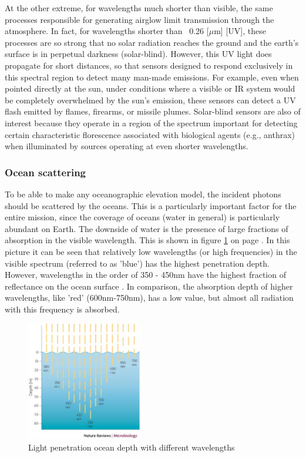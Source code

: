 At the other extreme, for wavelengths much shorter than visible, the same processes responsible for generating airglow limit transmission through the atmosphere. In fact, for wavelengths shorter than ~0.26 [$\mu$m] [\ac{UV}], these processes are so strong that no solar radiation reaches the ground and the earth's surface is in perpetual darkness (solar-blind). However, this \acs{UV} light does propagate for short distances, so that sensors designed to respond exclusively in this spectral region to detect many man-made emissions. For example, even when pointed directly at the sun, under conditions where a visible or \ac{IR} system would be completely overwhelmed by the sun's emission, these sensors can detect a UV flash emitted by flames, firearms, or missile plumes. Solar-blind sensors are also of interest because they operate in a region of the spectrum important for detecting certain characteristic florescence associated with biological agents (e.g., anthrax) when illuminated by sources operating at even shorter wavelengths. 

\subsubsection{Ocean scattering}
\label{introOcean}
To be able to make any oceanographic elevation model, the incident photons should be scattered by the oceans. This is a particularly important factor for the entire mission, since the coverage of oceans (water in general) is particularly abundant on Earth. The downside of water is the presence of large fractions of absorption in the visible wavelength. This is shown in figure \ref{fig:intro_ocean_penetrate} on page \pageref{fig:intro_ocean_penetrate}. In this picture it can be seen that relatively low wavelengths (or high frequencies) in the visible spectrum (referred to as 'blue') has the highest penetration depth. However, wavelengths in the order of 350 - 450nm have the highest fraction of reflectance on the ocean surface \cite{ocean_scattering}. In comparison, the absorption depth of higher wavelengths, like 'red' (600nm-750nm), has a low value, but almost all radiation with this frequency is absorbed. 

\begin{figure}[ht!]
\centering
\includegraphics[width=0.45\textwidth]{chapters/img/Ocean_absorption.jpg}
\caption{Light penetration ocean depth with different wavelengths}
\label{fig:intro_ocean_penetrate}
\end{figure}

